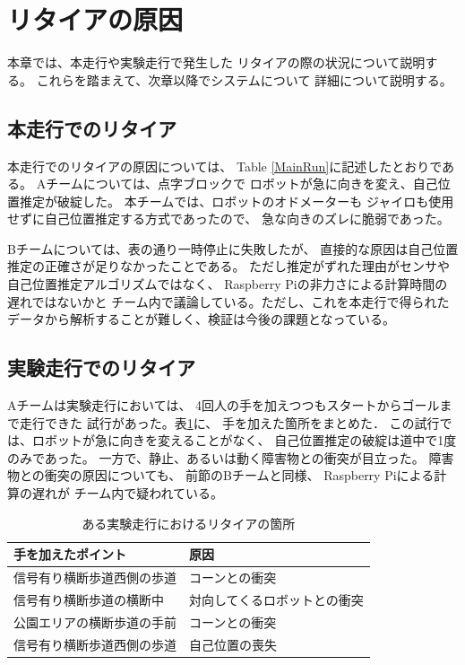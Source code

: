 \documentclass[twocolumn,9pt]{jsproceedings}
\begin{document}
\section{リタイアの原因}

本章では、本走行や実験走行で発生した
リタイアの際の状況について説明する。
これらを踏まえて、次章以降でシステムについて
詳細について説明する。

\subsection{本走行でのリタイア}


本走行でのリタイアの原因については、
Table \ref{MainRun}に記述したとおりである。
Aチームについては、点字ブロックで
ロボットが急に向きを変え、自己位置推定が破綻した。
本チームでは、ロボットのオドメーターも
ジャイロも使用せずに自己位置推定する方式であったので、
急な向きのズレに脆弱であった。

Bチームについては、表の通り一時停止に失敗したが、
直接的な原因は自己位置推定の正確さが足りなかったことである。
ただし推定がずれた理由がセンサや自己位置推定アルゴリズムではなく、
Raspberry Piの非力さによる計算時間の遅れではないかと
チーム内で議論している。ただし、これを本走行で得られた
データから解析することが難しく、検証は今後の課題となっている。

\subsection{実験走行でのリタイア}


Aチームは実験走行においては、
4回人の手を加えつつもスタートからゴールまで走行できた
試行があった。表\ref{4hands}に、
手を加えた箇所をまとめた．
この試行では、ロボットが急に向きを変えることがなく、
自己位置推定の破綻は道中で1度のみであった。
一方で、静止、あるいは動く障害物との衝突が目立った。
障害物との衝突の原因についても、
前節のBチームと同様、
Raspberry Piによる計算の遅れが
チーム内で疑われている。

\begin{table}[h]
  \caption{ある実験走行におけるリタイアの箇所}
  \label{4hands}
	\begin{tabular}{|l|p{3.5cm}|}
    \hline
    手を加えたポイント & 原因 \\
    \hline
    信号有り横断歩道西側の歩道 & コーンとの衝突 \\
    \hline
    信号有り横断歩道の横断中 & 対向してくるロボットとの衝突 \\ 
    \hline
    公園エリアの横断歩道の手前 & コーンとの衝突 \\ 
    \hline
    信号有り横断歩道西側の歩道 & 自己位置の喪失 \\ 
    \hline
  \end{tabular}
\end{table}
\end{document}
